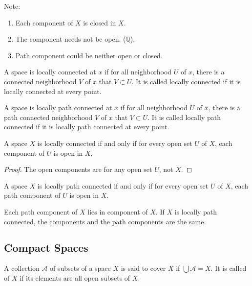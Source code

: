 Note: 
\begin{enumerate}
    \item Each component of $X$ is closed in $X$.
    \item The component needs not be open. ($\mathbb{Q}$).
    \item Path component could be neither open or closed.
\end{enumerate}

\begin{definition}
    A space is locally connected at $x$ if for all neighborhood $U$ of $x$, there is a connected neighborhood $V$ of $x$ that $V \subset U$. It is called locally connected if it is locally connected at every point.
\end{definition}

\begin{definition}
    A space is locally path connected at $x$ if for all neighborhood $U$ of $x$, there is a path connected neighborhood $V$ of $x$ that $V \subset U$. It is called locally path connected if it is locally path connected at every point.
\end{definition}

\begin{theorem}
A space $X$ is locally connected if and only if for every open set $U$ of $X$, each component of $U$ is open in $X$.    
\end{theorem}
\begin{proof}
    The open components are for any open set $U$, not $X$.
\end{proof}

\begin{theorem}
A space $X$ is locally path connected if and only if for every open set $U$ of $X$, each path component of $U$ is open in $X$.    
\end{theorem}

\begin{theorem}
Each path component of $X$ lies in component of $X$. If $X$ is locally path connected, the components and the path components are the same.    
\end{theorem}



\subsection{Compact Spaces}

\begin{definition}
    A collection $\mathcal{A}$ of subsets of a space $X$ is said to cover $X$ if $\bigcup \mathcal{A} = X$. It is called  of $X$ if its elements are all open subsets of $X$.
\end{definition}

